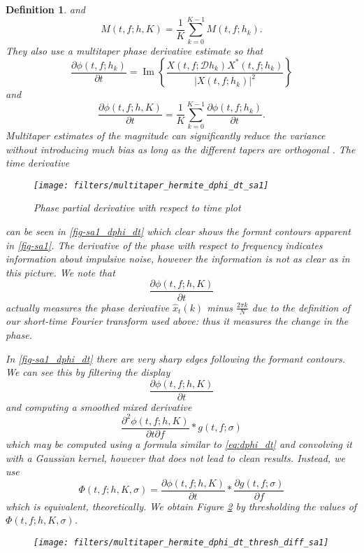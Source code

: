 \documentclass[english]{article}
\newtheorem{defn}{Definition}[section]
\begin{document}
\begin{defn}
and
\[
M(t,f;h,K)=\frac{1}{K}\sum_{k=0}^{K-1}M(t,f;h_{k}).
\]
 They also use a multitaper phase derivative estimate so that
\begin{equation}
\frac{\partial\phi(t,f;h_{k})}{\partial t}=\operatorname{Im}\left\{ \frac{X(t,f;\mathcal{D}h_{k})X^{*}(t,f;h_{k})}{|X(t,f;h_{k})|^{2}}\right\} \label{eq:dphi_dt}
\end{equation}
and
\[
\frac{\partial\phi(t,f;h,K)}{\partial t}=\frac{1}{K}\sum_{k=0}^{K-1}\frac{\partial\phi(t,f;h_{k})}{\partial t}.
\]
Multitaper estimates of the magnitude can significantly reduce the
variance without introducing much bias as long as the different tapers
are orthogonal \cite{percivalwalden93}. The time derivative 
\begin{figure}
\begin{centering}
\label{fig-sa1_dphi_dt}\texttt{[image: filters/multitaper\_hermite\_dphi\_dt\_sa1]}
\par\end{centering}

\caption{Phase partial derivative with respect to time plot}
\end{figure}
 can be seen in \autoref{fig-sa1_dphi_dt} which clear shows the
formnt contours apparent in \autoref{fig-sa1}. The derivative
of the phase with respect to frequency indicates information about
impulsive noise, however the information is not as clear as in this
picture. We note that 
\[
\frac{\partial\phi(t,f;h,K)}{\partial t}
\]
actually measures the phase derivative $\hat{x}_{t}(k)$ minus $\frac{2\pi k}{N}$
due to the definition of our short-time Fourier transform used above:
thus it measures the change in the phase. 

In \autoref{fig-sa1_dphi_dt} there are very sharp edges following
the formant contours. We can see this by filtering the display
\[
\frac{\partial\phi(t,f;h,K)}{\partial t}
\]
and computing a smoothed mixed derivative
\[
\frac{\partial^{2}\phi(t,f;h,K)}{\partial t\partial f}*g(t,f;\sigma)
\]
which may be computed using a formula similar to \autoref{eq:dphi_dt}
and convolving it with a Gaussian kernel, however that does not lead
to clean results. Instead, we use 
\begin{equation}\label{eq:phase-peak-phi}
\Phi(t,f;h,K,\sigma)=\frac{\partial\phi(t,f;h,K)}{\partial t}*\frac{\partial g(t,f;\sigma)}{\partial f}
\end{equation}
which is equivalent, theoretically. We obtain Figure \ref{fig-sa1_d2phi_dtdw_gauss}
by thresholding the values of $\Phi(t,f;h,K,\sigma)$.
\begin{figure}
\begin{centering}
\label{fig-sa1_d2phi_dtdw_gauss}\texttt{[image: filters/multitaper\_hermite\_dphi\_dt\_thresh\_diff\_sa1]}
\par\end{centering}


\end{figure}
\end{defn}
\end{document}
